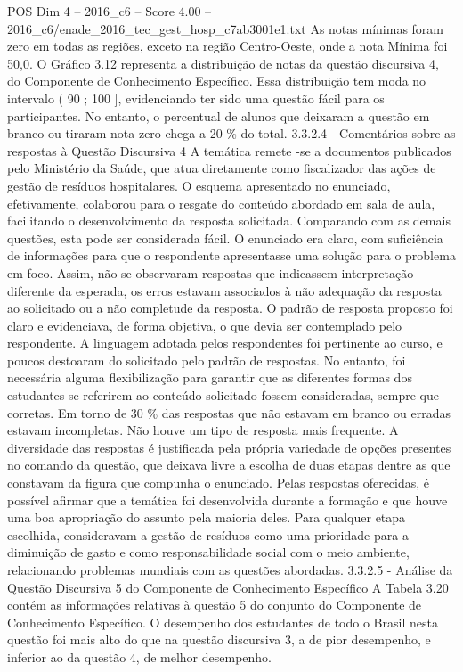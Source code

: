 \begin{textsample}{POS Dim 4 – 2016\_c6 – Score 4.00 – 2016\_c6/enade\_2016\_tec\_gest\_hosp\_c7ab3001e1.txt}
As notas mínimas foram zero em todas as regiões, exceto na região Centro-Oeste, onde a nota Mínima foi 50,0.
O Gráfico 3.12 representa a distribuição de notas da questão discursiva 4, do Componente de Conhecimento Específico.
Essa distribuição tem moda no intervalo ( 90 ; 100 ], evidenciando ter sido uma questão fácil para os participantes.
No entanto, o percentual de alunos que deixaram a questão em branco ou tiraram nota zero chega a 20 \% do total. 3.3.2.4 - Comentários sobre as respostas à Questão Discursiva 4 A temática remete -se a documentos publicados pelo Ministério da Saúde, que atua diretamente como fiscalizador das ações de gestão de resíduos hospitalares.
O esquema apresentado no enunciado, efetivamente, colaborou para o resgate do conteúdo abordado em sala de aula, facilitando o desenvolvimento da resposta solicitada.
Comparando com as demais questões, esta pode ser considerada fácil.
O enunciado era claro, com suficiência de informações para que o respondente apresentasse uma solução para o problema em foco.
Assim, não se observaram respostas que indicassem interpretação diferente da esperada, os erros estavam associados à não adequação da resposta ao solicitado ou a não completude da resposta.
O padrão de resposta proposto foi claro e evidenciava, de forma objetiva, o que devia ser contemplado pelo respondente.
A linguagem adotada pelos respondentes foi pertinente ao curso, e poucos destoaram do solicitado pelo padrão de respostas.
No entanto, foi necessária alguma flexibilização para garantir que as diferentes formas dos estudantes se referirem ao conteúdo solicitado fossem consideradas, sempre que corretas.
Em torno de 30 \% das respostas que não estavam em branco ou erradas estavam incompletas.
Não houve um tipo de resposta mais frequente.
A diversidade das respostas é justificada pela própria variedade de opções presentes no comando da questão, que deixava livre a escolha de duas etapas dentre as que constavam da figura que compunha o enunciado.
Pelas respostas oferecidas, é possível afirmar que a temática foi desenvolvida durante a formação e que houve uma boa apropriação do assunto pela maioria deles.
Para qualquer etapa escolhida, consideravam a gestão de resíduos como uma prioridade para a diminuição de gasto e como responsabilidade social com o meio ambiente, relacionando problemas mundiais com as questões abordadas. 3.3.2.5 - Análise da Questão Discursiva 5 do Componente de Conhecimento Específico A Tabela 3.20 contém as informações relativas à questão 5 do conjunto do Componente de Conhecimento Específico.
O desempenho dos estudantes de todo o Brasil nesta questão foi mais alto do que na questão discursiva 3, a de pior desempenho, e inferior ao da questão 4, de melhor desempenho.

\end{textsample}
